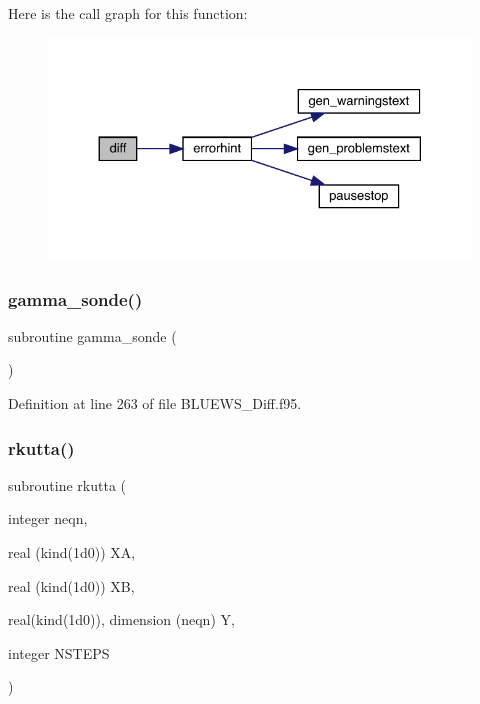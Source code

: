 Here is the call graph for this function\+:\nopagebreak
\begin{figure}[H]
\begin{center}
\leavevmode
\includegraphics[width=330pt]{_b_l_u_e_w_s___diff_8f95_ac594a7935b340caab469006de9da9358_cgraph}
\end{center}
\end{figure}
\mbox{\label{_b_l_u_e_w_s___diff_8f95_a27fc32bfb9bfb2d6e21511c2e8c9bfed}} 
\subsubsection{\texorpdfstring{gamma\+\_\+sonde()}{gamma\_sonde()}}
{\footnotesize\ttfamily subroutine gamma\+\_\+sonde (\begin{DoxyParamCaption}{ }\end{DoxyParamCaption})}



Definition at line 263 of file B\+L\+U\+E\+W\+S\+\_\+\+Diff.\+f95.

\mbox{\label{_b_l_u_e_w_s___diff_8f95_aa6b01ddf379446848f8a822a7918fcd0}} 
\subsubsection{\texorpdfstring{rkutta()}{rkutta()}}
{\footnotesize\ttfamily subroutine rkutta (\begin{DoxyParamCaption}\item[{integer}]{neqn,  }\item[{real (kind(1d0))}]{XA,  }\item[{real (kind(1d0))}]{XB,  }\item[{real(kind(1d0)), dimension (neqn)}]{Y,  }\item[{integer}]{N\+S\+T\+E\+PS }\end{DoxyParamCaption})}




